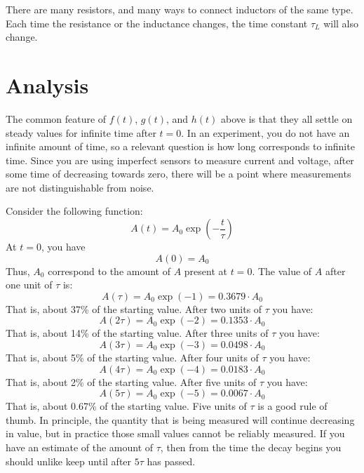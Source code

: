 There are many resistors, and many ways to connect inductors of the same type. Each time the resistance or the inductance changes, the time constant $\tau_{L}$ will also change.
%
\section{Analysis}
%
The common feature of $f(t)$, $g(t)$, and $h(t)$ above is that they all settle on steady values for infinite time after $t = 0$. In an experiment, you do not have an infinite amount of time, so a relevant question is how long corresponds to infinite time. Since you are using imperfect sensors to measure current and voltage, after some time of decreasing towards zero, there will be a point where measurements are not distinguishable from noise.

Consider the following function:
\begin{equation}
    A(t) = A_{0} \exp\left(- \frac{t}{\tau}\right)
\end{equation}
At $t = 0$, you have
\begin{equation}
    A(0) = A_{0}
\end{equation}
Thus, $A_{0}$ correspond to the amount of $A$ present at $t = 0$. The value of $A$ after one unit of $\tau$ is:
\begin{equation}
    A(\tau) = A_{0} \exp\left(-1\right) = 0.3679 \cdot A_{0}
\end{equation}
That is, about 37\% of the starting value. After two units of $\tau$ you have:
\begin{equation}
    A(2\tau) = A_{0} \exp\left(-2\right) = 0.1353 \cdot A_{0}
\end{equation}
That is, about 14\% of the starting value. After three units of $\tau$ you have:
\begin{equation}
    A(3\tau) = A_{0} \exp\left(-3\right) = 0.0498 \cdot A_{0}
\end{equation}
That is, about 5\% of the starting value. After four units of $\tau$ you have:
\begin{equation}
    A(4\tau) = A_{0} \exp\left(-4\right) = 0.0183 \cdot A_{0}
\end{equation}
That is, about 2\% of the starting value. After five units of $\tau$ you have:
\begin{equation}
    A(5\tau) = A_{0} \exp\left(-5\right) = 0.0067 \cdot A_{0}
\end{equation}
That is, about 0.67\% of the starting value. Five units of $\tau$ is a good rule of thumb. In principle, the quantity that is being measured will continue decreasing in value, but in practice those small values cannot be reliably measured. If you have an estimate of the amount of $\tau$, then from the time the decay begins you should unlike keep until after $5 \tau$ has passed.
%
